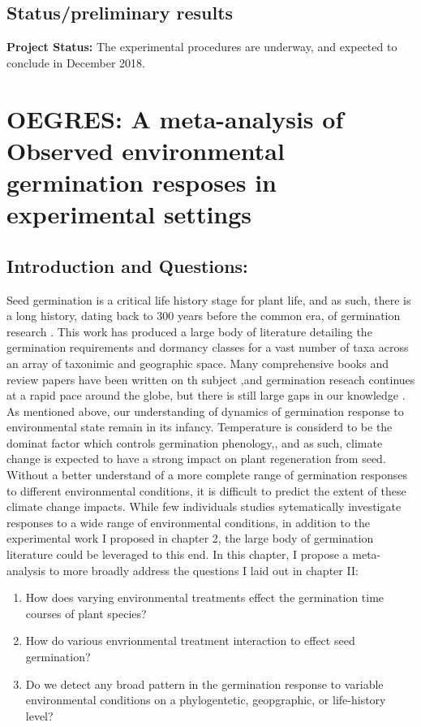 \documentclass{article}\usepackage[]{graphicx}\usepackage[]{color}
\begin{document}
\subsection{Status/preliminary results}
\textbf{Project Status:} The experimental procedures are underway, and expected to conclude in December 2018.\\
\section*{OEGRES: A meta-analysis of Observed environmental germination resposes in experimental settings}
\subsection*{Introduction and Questions:}
\indent Seed germination is a critical life history stage for plant life, and as such, there is a long history, dating back to 300 years before the common era, of germination research \citep{Baskin_2014}. This work has produced a large body of literature detailing the germination requirements and dormancy classes for a vast number of taxa across an array of taxonimic and geographic space. Many comprehensive books and review papers have been written on th subject \citep*{},and germination reseach continues at a rapid pace around the globe, but there is still large gaps in our knowledge \citep{Baskin_2014}. As mentioned above, our understanding of  dynamics of germination response to environmental state remain in its infancy. Temperature is considerd to be the dominat factor which controls germination phenology,\citep{}, and as such, climate change is expected to have a strong impact on plant regeneration from seed. Without a better understand of a more complete range of germination responses to different environmental conditions, it is difficult to predict the extent of these climate change impacts. While few individuals studies sytematically investigate responses to a wide range of environmental conditions, in addition to the experimental work I proposed in chapter 2, the large body of germination literature could be leveraged to this end. In this chapter, I propose a meta-analysis to more broadly address the questions I laid out in chapter II:
\begin{enumerate}
\item How does varying environmental treatments effect the germination time courses of plant species?
\item How do various envrionmental treatment interaction to effect seed germination?
\item Do we detect any broad pattern in the germination response to variable environmental conditions on a phylogentetic, geopgraphic, or life-history level?
\end{enumerate}
\end{document}
